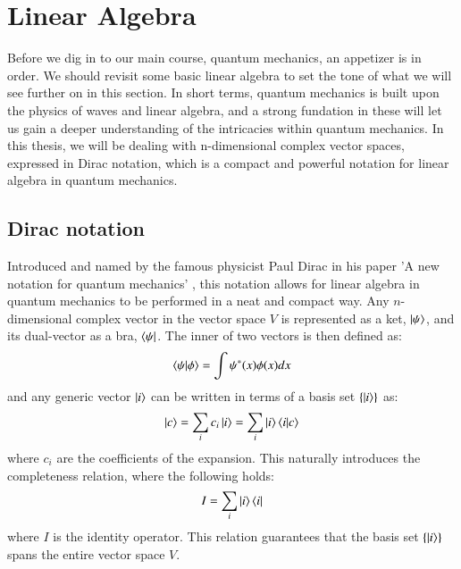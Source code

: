 \documentclass{subfiles}
\begin{document}
\section{Linear Algebra}
Before we dig in to our main course, quantum mechanics, an appetizer is in order. We should revisit some basic linear algebra to set the tone of what we will see further on in this section.
In short terms, quantum mechanics is built upon the physics of waves and linear algebra, and a strong fundation in these will let us gain a deeper understanding of the intricacies within quantum mechanics.
In this thesis, we will be dealing with n-dimensional complex vector spaces, expressed in Dirac notation, which is a compact and powerful notation for linear algebra in quantum mechanics.
\subsection{Dirac notation}
Introduced and named by the famous physicist Paul Dirac in his paper 'A new notation for quantum mechanics' \cite{dirac_1939}, this notation allows for linear algebra in quantum mechanics to be performed in a neat and compact way. Any $n$-dimensional complex vector in the vector space $V$ is represented as a ket, $\ket{\psi}$, and its dual-vector as a bra, $\bra{\psi}$. The inner of two vectors is then defined as:
\begin{align*}
        \braket{\psi|\phi} = \int \psi^*(x)\phi(x) dx
\end{align*} 
and any generic vector $\ket{i}$ can be written in terms of a basis set $\{\ket{i}\}$ as:
\begin{align}
    \ket{c} = \sum_i c_i \ket{i} = \sum_i \ket{i}\braket{i|c} 
\end{align}
where $c_i$ are the coefficients of the expansion. This naturally introduces the completeness relation, where the following holds:
\begin{equation}
    I = \sum_i \ket{i}\bra{i}
\end{equation}
where $I$ is the identity operator. This relation guarantees that the basis set $\{\ket{i}\}$ spans the entire vector space $V$.

\end{document}
